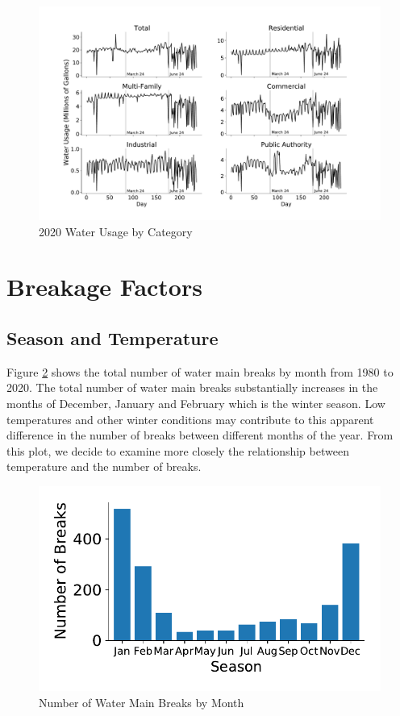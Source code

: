\documentclass[twocolumn]{article}
\begin{document}
\begin{figure}
    \includegraphics[width=\textwidth]{Bryan/all_water_usage_2020.pdf}
    \caption{2020 Water Usage by Category}
    \label{fig:water usage by category}
\end{figure}




\section{Breakage Factors}


\subsection{Season and Temperature}

Figure \ref{fig:Hi} shows the total number of water main breaks by month from 1980 to 2020. The total number of water main breaks substantially increases in the months of December, January and February which is the winter season. Low temperatures and other winter conditions may contribute to this apparent difference in the number of breaks between different months of the year. From this plot, we decide to examine more closely the relationship between temperature and the number of breaks. 

\begin{figure}[H]
    \includegraphics[width=\columnwidth]{Wen/breaks by month.pdf}
    \caption{Number of Water Main Breaks by Month}
    \label{fig:Hi}
\end{figure}
\end{document}
